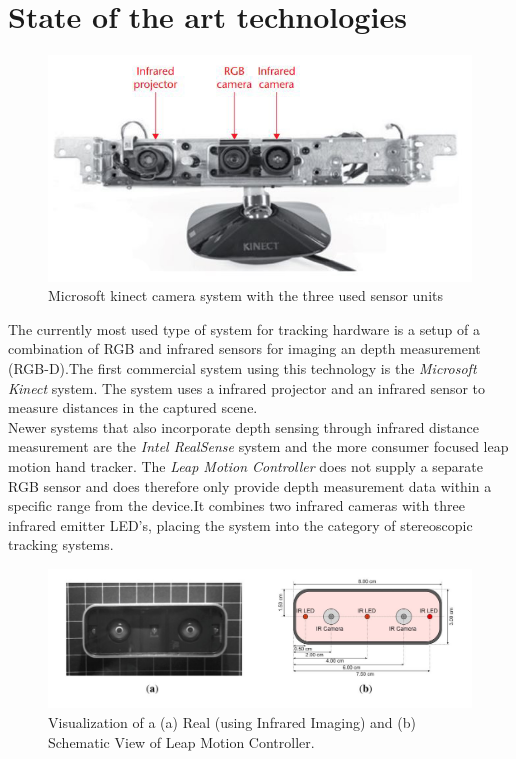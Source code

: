 \section{State of the art technologies}
\label{sec:state_of_the_art}
\begin{figure}
\label{img:kinect}
\includegraphics[width=\textwidth/2]{images/kinnect.JPG} 
\caption{Microsoft kinect camera system with the three used sensor units\cite{Zhang.2012}}
\end{figure}
The currently most used type of system for tracking hardware is a setup of a combination of RGB and infrared sensors for imaging an depth measurement (RGB-D).The first commercial system using this technology is the\textit{ Microsoft Kinect} system\cite{Zhang.2012}. The system uses a infrared projector and an infrared sensor to measure distances in the captured scene.\\
Newer systems that also incorporate depth sensing through infrared distance measurement are the \textit{Intel RealSense} system and the more consumer focused leap motion hand tracker. The\textit{ Leap Motion Controller} does not supply a separate RGB sensor and does therefore only provide depth measurement data within a specific range from the device\cite{Weichert.2013}.It combines two infrared cameras with three infrared emitter LED's, placing the system into the category of stereoscopic tracking systems.
\begin{figure}[H]
\includegraphics[width=\textwidth]{images/leapMotion.JPG}
\caption{Visualization of a (a) Real (using Infrared Imaging) and (b) Schematic View of Leap Motion Controller\cite{Weichert.2013}.}
\label{img:leapMotion} 
\end{figure}

